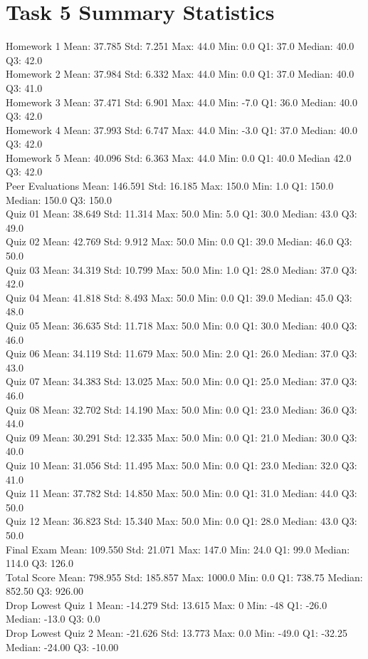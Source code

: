 \documentclass{article}
\begin{document}
\section{Task 5 Summary Statistics}
Homework 1 
Mean: 37.785 Std: 7.251 Max: 44.0 Min: 0.0
Q1: 37.0 Median: 40.0 Q3: 42.0
\\Homework 2 Mean: 37.984 Std: 6.332 Max: 44.0 Min: 0.0
Q1: 37.0 Median: 40.0 Q3: 41.0
\\Homework 3 Mean: 37.471 Std: 6.901 Max: 44.0 Min: -7.0
Q1: 36.0 Median: 40.0 Q3: 42.0
\\Homework 4 Mean: 
37.993 Std: 6.747 Max: 44.0 Min: -3.0
Q1:    37.0 Median:    40.0 Q3:    42.0
\\Homework 5 Mean: 40.096 Std: 6.363 Max: 44.0 Min: 0.0
Q1:    40.0 Median    42.0 Q3:    42.0
\\Peer Evaluations Mean: 146.591 Std: 16.185 Max: 150.0 Min: 1.0
Q1:    150.0 Median:    150.0 Q3:    150.0
\\Quiz 01 Mean: 38.649 Std: 11.314 Max: 50.0 Min: 5.0
Q1:    30.0 Median:    43.0 Q3:    49.0
\\Quiz 02 Mean: 42.769 Std: 9.912 Max: 50.0 Min: 0.0
Q1:    39.0 Median:    46.0 Q3:    50.0
\\Quiz 03 Mean: 34.319 Std: 10.799 Max: 50.0 Min: 1.0
Q1:    28.0 Median:    37.0 Q3:    42.0
\\Quiz 04 Mean: 41.818 Std: 8.493 Max: 50.0 Min: 0.0
Q1:    39.0 Median:    45.0 Q3:    48.0
\\Quiz 05 Mean: 36.635 Std: 11.718 Max: 50.0 Min: 0.0
Q1:    30.0 Median:    40.0 Q3:    46.0
\\Quiz 06 Mean: 34.119 Std: 11.679 Max: 50.0 Min: 2.0
Q1:    26.0 Median:    37.0 Q3:    43.0
\\Quiz 07 Mean: 34.383 Std: 13.025 Max: 50.0 Min: 0.0
Q1:    25.0 Median:    37.0 Q3:    46.0
\\Quiz 08 Mean: 32.702 Std: 14.190 Max: 50.0 Min: 0.0
Q1:    23.0 Median:    36.0 Q3:    44.0
\\Quiz 09 Mean: 30.291 Std: 12.335 Max: 50.0 Min: 0.0
Q1:    21.0 Median:    30.0 Q3:    40.0
\\Quiz 10 Mean: 31.056 Std: 11.495 Max: 50.0 Min: 0.0
Q1:    23.0 Median:    32.0 Q3:    41.0
\\Quiz 11 Mean: 37.782 Std: 14.850 Max: 50.0 Min: 0.0
Q1:    31.0 Median:    44.0 Q3:    50.0
\\Quiz 12 Mean: 36.823 Std: 15.340 Max: 50.0 Min: 0.0
Q1:    28.0 Median:    43.0 Q3:    50.0
\\Final Exam Mean: 109.550 Std: 21.071 Max: 147.0 Min: 24.0
Q1:     99.0 Median:    114.0 Q3:    126.0
\\Total Score Mean: 798.955 Std: 185.857 Max: 1000.0 Min: 0.0
Q1:    738.75 Median:    852.50 Q3:    926.00
\\Drop Lowest Quiz 1 Mean: -14.279 Std: 13.615 Max: 0 Min: -48
Q1:   -26.0 Median:   -13.0 Q3:     0.0
\\Drop Lowest Quiz 2 Mean: -21.626 Std: 13.773 Max: 0.0 Min: -49.0
Q1:   -32.25 Median:   -24.00 Q3:   -10.00
\end{document}
